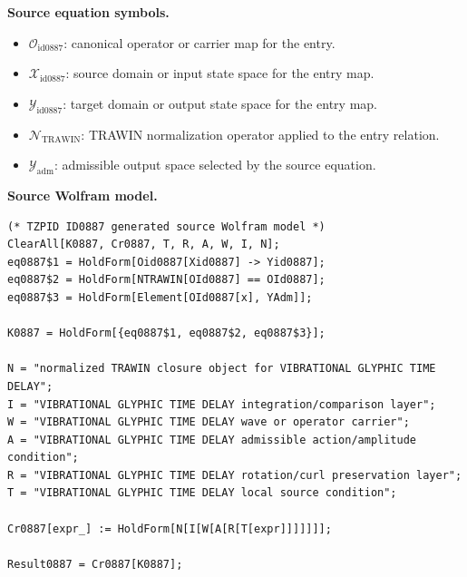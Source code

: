 \begin{minipage}[t]{0.49\linewidth}
\begingroup
\small
\raggedright
\textbf{Source equation symbols.}\par
\begin{itemize}[leftmargin=1.35em,itemsep=1pt,topsep=1pt,parsep=0pt]
    \item $\mathcal{O}_{\mathrm{id0887}}$: canonical operator or carrier map for the entry.
    \item $\mathcal{X}_{\mathrm{id0887}}$: source domain or input state space for the entry map.
    \item $\mathcal{Y}_{\mathrm{id0887}}$: target domain or output state space for the entry map.
    \item $\mathcal{N}_{\mathrm{TRAWIN}}$: TRAWIN normalization operator applied to the entry relation.
    \item $\mathcal{Y}_{\mathrm{adm}}$: admissible output space selected by the source equation.
\end{itemize}
\endgroup
\end{minipage}\hfill
\begin{minipage}[t]{0.47\linewidth}
\begingroup
\scriptsize
\raggedright
\textbf{Source Wolfram model.}\par
\begin{Verbatim}[fontsize=\tiny,breaklines=true,breakanywhere=true]
(* TZPID ID0887 generated source Wolfram model *)
ClearAll[K0887, Cr0887, T, R, A, W, I, N];
eq0887$1 = HoldForm[Oid0887[Xid0887] -> Yid0887];
eq0887$2 = HoldForm[NTRAWIN[OId0887] == OId0887];
eq0887$3 = HoldForm[Element[OId0887[x], YAdm]];

K0887 = HoldForm[{eq0887$1, eq0887$2, eq0887$3}];

N = "normalized TRAWIN closure object for VIBRATIONAL GLYPHIC TIME DELAY";
I = "VIBRATIONAL GLYPHIC TIME DELAY integration/comparison layer";
W = "VIBRATIONAL GLYPHIC TIME DELAY wave or operator carrier";
A = "VIBRATIONAL GLYPHIC TIME DELAY admissible action/amplitude condition";
R = "VIBRATIONAL GLYPHIC TIME DELAY rotation/curl preservation layer";
T = "VIBRATIONAL GLYPHIC TIME DELAY local source condition";

Cr0887[expr_] := HoldForm[N[I[W[A[R[T[expr]]]]]]];

Result0887 = Cr0887[K0887];
\end{Verbatim}
\endgroup
\end{minipage}

